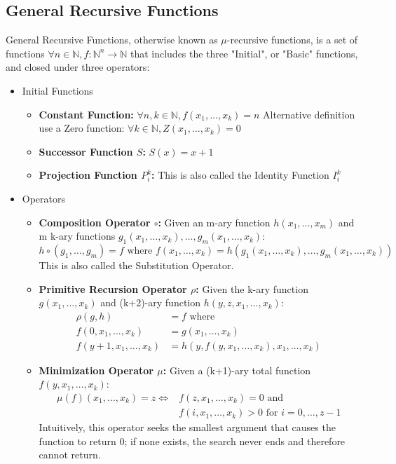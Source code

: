 \documentclass{report}
\begin{document}
			\subsection{General Recursive Functions}
				\begin{defn} \label{def_general_recursive_function}
					General Recursive Functions, otherwise known as $\mu$-recursive functions, is a set of functions $\forall n \in \mathbb{N}, f:\mathbb{N}^n \rightarrow \mathbb{N}$ that includes the three "Initial", or "Basic" functions, and closed under three operators:
					\begin{itemize}
						\item Initial Functions
						\begin{itemize}
							\item \textbf{Constant Function:} $\forall n,k \in \mathbb{N}, f(x_1,\dots,x_k)=n$
								\subitem Alternative definition use a Zero function: $\forall k \in \mathbb{N}, Z(x_1,\dots,x_k)=0$
							\item \textbf{Successor Function $S$:} $S(x)=x+1$
							\item \textbf{Projection Function $P_i^k$:}
								\subitem This is also called the Identity Function $I_i^k$
						\end{itemize}
						\item Operators
						\begin{itemize}
							\item \textbf{Composition Operator $\circ$:} Given an m-ary function $h(x_1,\dots,x_m)$ and m k-ary functions $g_1(x_1,\dots,x_k),\dots,g_m(x_1,\dots,x_k)$:
							\begin{displaymath}
								h \circ (g_1,\dots,g_m)=f \text{   where   } f(x_1,\dots,x_k)=h(g_1(x_1,\dots,x_k),\dots,g_m(x_1,\dots,x_k))
							\end{displaymath}
								\subitem This is also called the Substitution Operator.
							\item \textbf{Primitive Recursion Operator $\rho$:} Given the k-ary function $g(x_1,\dots,x_k)$ and (k+2)-ary function $h(y,z,x_1,\dots,x_k)$:
							\begin{align*}
								\rho(g,h)&=f \text{   where}\\
								f(0,x_1,\dots,x_k)&=g(x_1,\dots,x_k)\\
								f(y+1,x_1,\dots,x_k)&=h(y,f(y,x_1,\dots,x_k),x_1,\dots,x_k)
							\end{align*}
							\item \textbf{Minimization Operator $\mu$:} Given a (k+1)-ary total function $f(y,x_1,\dots,x_k)$:
							\begin{align*}
								\mu (f)(x_1,\dots,x_k)=z \Leftrightarrow& f(z,x_1,\dots,x_k)=0 \text{   and}\\&f(i,x_1,\dots,x_k)>0 \text{   for   } i=0,\dots,z-1
							\end{align*}
								\subitem Intuitively, this operator seeks the smallest argument that causes the function to return 0; if none exists, the search never ends and therefore cannot return.
						\end{itemize}
					\end{itemize}
				\end{defn}
			
\end{document}

